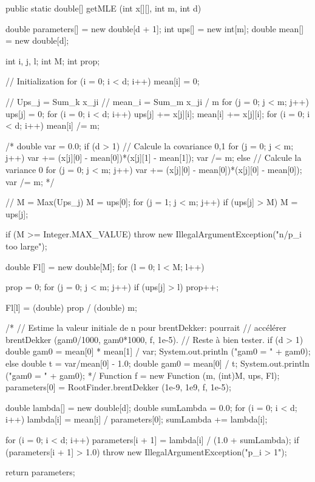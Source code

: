 \begin{code}

   public static double[] getMLE (int x[][], int m, int d)\begin{hide} {
      double parameters[] = new double[d + 1];
      int ups[] = new int[m];
      double mean[] = new double[d];

      int i, j, l;
      int M;
      int prop;

      // Initialization
      for (i = 0; i < d; i++)
         mean[i] = 0;

      // Ups_j = Sum_k x_ji
      // mean_i = Sum_m x_ji / m
      for (j = 0; j < m; j++) {
         ups[j] = 0;
         for (i = 0; i < d; i++) {
            ups[j] += x[j][i];
            mean[i] += x[j][i];
         }
      }
      for (i = 0; i < d; i++)
         mean[i] /= m;

/*
      double var = 0.0;
      if (d > 1) {
         // Calcule la covariance 0,1
         for (j = 0; j < m; j++)
            var += (x[j][0] - mean[0])*(x[j][1] - mean[1]);
         var /= m;
      } else {
         // Calcule la variance 0
         for (j = 0; j < m; j++)
            var += (x[j][0] - mean[0])*(x[j][0] - mean[0]);
         var /= m;
      }
*/

      // M = Max(Ups_j)
      M = ups[0];
      for (j = 1; j < m; j++)
         if (ups[j] > M)
            M = ups[j];

      if (M >= Integer.MAX_VALUE)
         throw new IllegalArgumentException("n/p_i too large");

      double Fl[] = new double[M];
      for (l = 0; l < M; l++) {
         prop = 0;
         for (j = 0; j < m; j++)
            if (ups[j] > l)
               prop++;

         Fl[l] = (double) prop / (double) m;
      }

/*
      // Estime la valeur initiale de n pour brentDekker: pourrait
      // accélérer brentDekker (gam0/1000, gam0*1000, f, 1e-5).
      // Reste à bien tester.
      if (d > 1) {
         double gam0 = mean[0] * mean[1] / var;
         System.out.println ("gam0 = " + gam0);
      } else {
         double t = var/mean[0] - 1.0;
         double gam0 = mean[0] / t;
         System.out.println ("gam0 = " + gam0);
      }
*/
      Function f = new Function (m, (int)M, ups, Fl);
      parameters[0] = RootFinder.brentDekker (1e-9, 1e9, f, 1e-5);

      double lambda[] = new double[d];
      double sumLambda = 0.0;
      for (i = 0; i < d; i++) {
         lambda[i] = mean[i] / parameters[0];
         sumLambda += lambda[i];
      }

      for (i = 0; i < d; i++) {
         parameters[i + 1] = lambda[i] / (1.0 + sumLambda);
         if (parameters[i + 1] > 1.0)
            throw new IllegalArgumentException("p_i > 1");
      }

      return parameters;
   }\end{hide}
\end{code}
